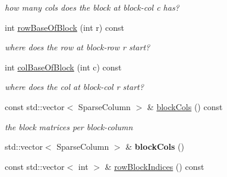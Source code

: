 \begin{DoxyCompactItemize}
\begin{DoxyCompactList}\small\item\em how many cols does the block at block-\/col c has? \end{DoxyCompactList}\item 
\hypertarget{classg2o_1_1SparseBlockMatrixHashMap_afd1b66bfdc86abfee8178cf277fd5253}{int \hyperlink{classg2o_1_1SparseBlockMatrixHashMap_afd1b66bfdc86abfee8178cf277fd5253}{row\-Base\-Of\-Block} (int r) const }\label{classg2o_1_1SparseBlockMatrixHashMap_afd1b66bfdc86abfee8178cf277fd5253}

\begin{DoxyCompactList}\small\item\em where does the row at block-\/row r start? \end{DoxyCompactList}\item 
\hypertarget{classg2o_1_1SparseBlockMatrixHashMap_a533a55bea873a2851741f8f5be3cfd83}{int \hyperlink{classg2o_1_1SparseBlockMatrixHashMap_a533a55bea873a2851741f8f5be3cfd83}{col\-Base\-Of\-Block} (int c) const }\label{classg2o_1_1SparseBlockMatrixHashMap_a533a55bea873a2851741f8f5be3cfd83}

\begin{DoxyCompactList}\small\item\em where does the col at block-\/col r start? \end{DoxyCompactList}\item 
\hypertarget{classg2o_1_1SparseBlockMatrixHashMap_a9d81b373b456ec74e214d1e378664933}{const std\-::vector$<$ Sparse\-Column $>$ \& \hyperlink{classg2o_1_1SparseBlockMatrixHashMap_a9d81b373b456ec74e214d1e378664933}{block\-Cols} () const }\label{classg2o_1_1SparseBlockMatrixHashMap_a9d81b373b456ec74e214d1e378664933}

\begin{DoxyCompactList}\small\item\em the block matrices per block-\/column \end{DoxyCompactList}\item 
\hypertarget{classg2o_1_1SparseBlockMatrixHashMap_a2879ea0d9b530e7c522c912dff279b5d}{std\-::vector$<$ Sparse\-Column $>$ \& {\bfseries block\-Cols} ()}\label{classg2o_1_1SparseBlockMatrixHashMap_a2879ea0d9b530e7c522c912dff279b5d}

\item 
\hypertarget{classg2o_1_1SparseBlockMatrixHashMap_ab68b1dacc1fe4abc86eef0df9caf283c}{const std\-::vector$<$ int $>$ \& \hyperlink{classg2o_1_1SparseBlockMatrixHashMap_ab68b1dacc1fe4abc86eef0df9caf283c}{row\-Block\-Indices} () const }\label{classg2o_1_1SparseBlockMatrixHashMap_ab68b1dacc1fe4abc86eef0df9caf283c}


\end{DoxyCompactItemize}
